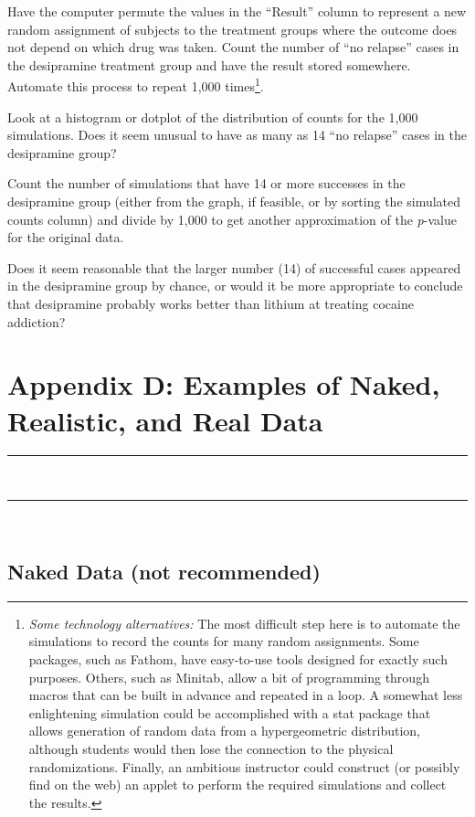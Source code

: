 \documentclass[twoside,openany]{tufte-book}
\begin{document}
Have the computer permute the values in the ``Result'' column to represent a new random assignment of subjects to the treatment groups where the outcome does not depend on which drug was taken.  Count the number of ``no relapse'' cases in the desipramine treatment group and have the result stored somewhere.   Automate this process to repeat 1,000 times\footnote{\textit{Some technology alternatives:} The most difficult step here is to automate the simulations to record the counts for many random assignments.  Some packages, such as Fathom, have easy-to-use tools designed for exactly such purposes.  Others, such as Minitab, allow a bit of programming through macros that can be built in advance and repeated in a loop.  A somewhat less enlightening simulation could be accomplished with a stat package that allows generation of random data from a hypergeometric distribution, although students would then lose the connection to the physical randomizations.  Finally, an ambitious instructor could construct (or possibly find on the web) an applet to perform the required simulations and collect the results.}. 

Look at a histogram or dotplot of the distribution of counts for the 1,000 simulations.  Does it seem unusual to have as many as 14 ``no relapse'' cases in the desipramine group? 

Count the number of simulations that have 14 or more successes in the desipramine group (either from the graph, if feasible, or by sorting the simulated counts column) and divide by 1,000 to get another approximation of the \textit{p}-value for the original data.  

Does it seem reasonable that the larger number (14) of successful cases appeared in the desipramine group by chance, or would it be more appropriate to conclude that desipramine probably works better than lithium at treating cocaine addiction? 

\chapter{Appendix D: Examples of Naked, Realistic, and Real Data}
\vspace{-.53in}
   \noindent\color{graylight}\rule[0cm]{3.25in}{0.03cm} \\
    \noindent\color{graylight}\rule[0.4cm]{3.25in}{0.03cm} \\
\color{black}
\vspace{-.25in}

\section{\textbf{Naked Data (not recommended)}}
\end{document}
